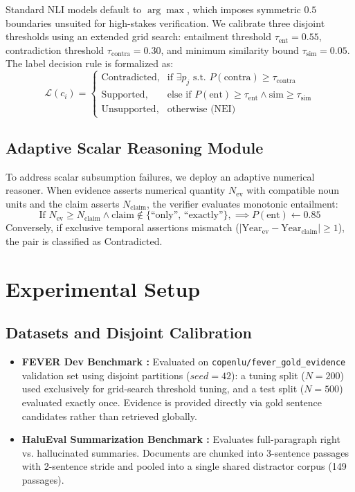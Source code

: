 \documentclass[conference]{IEEEtran}
\begin{document}
Standard NLI models default to $\arg\max$, which imposes symmetric $0.5$ boundaries unsuited for high-stakes verification. We calibrate three disjoint thresholds using an extended grid search: entailment threshold $\tau_{\text{ent}} = 0.55$, contradiction threshold $\tau_{\text{contra}} = 0.30$, and minimum similarity bound $\tau_{\text{sim}} = 0.05$.
The label decision rule is formalized as:
\begin{equation}
\mathcal{L}(c_i) = 
\begin{cases}
\text{Contradicted}, & \text{if } \exists p_j \text{ s.t. } P(\text{contra}) \ge \tau_{\text{contra}} \\
\text{Supported}, & \text{else if } P(\text{ent}) \ge \tau_{\text{ent}} \land \text{sim} \ge \tau_{\text{sim}} \\
\text{Unsupported}, & \text{otherwise (NEI)}
\end{cases}
\end{equation}

\subsection{Adaptive Scalar Reasoning Module}
To address scalar subsumption failures, we deploy an adaptive numerical reasoner. When evidence asserts numerical quantity $N_{\text{ev}}$ with compatible noun units and the claim asserts $N_{\text{claim}}$, the verifier evaluates monotonic entailment:
\begin{equation}
\text{If } N_{\text{ev}} \ge N_{\text{claim}} \land \text{claim} \notin \{\text{``only'', ``exactly''}\}, \implies P(\text{ent}) \leftarrow 0.85
\end{equation}
Conversely, if exclusive temporal assertions mismatch ($|\text{Year}_{\text{ev}} - \text{Year}_{\text{claim}}| \ge 1$), the pair is classified as Contradicted.

\section{Experimental Setup}

\subsection{Datasets and Disjoint Calibration}
\begin{itemize}
    \item \textbf{FEVER Dev Benchmark \cite{thorne2018fever}:} Evaluated on \texttt{copenlu/fever\_gold\_evidence} validation set using disjoint partitions ($seed=42$): a tuning split ($N=200$) used exclusively for grid-search threshold tuning, and a test split ($N=500$) evaluated exactly once. Evidence is provided directly via gold sentence candidates rather than retrieved globally.
    \item \textbf{HaluEval Summarization Benchmark \cite{li2023halueval}:} Evaluates full-paragraph right vs. hallucinated summaries. Documents are chunked into 3-sentence passages with 2-sentence stride and pooled into a single shared distractor corpus (149 passages).
\end{itemize}
\end{document}
